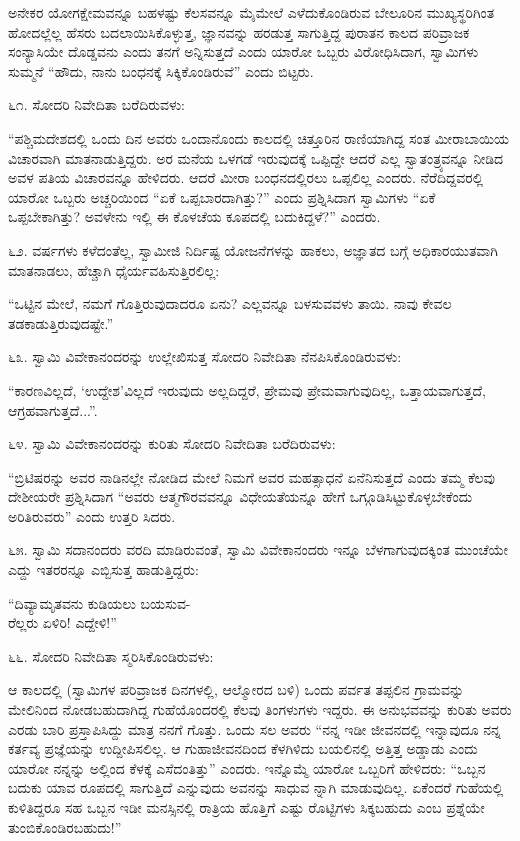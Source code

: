 ಅನೇಕರ ಯೋಗಕ್ಷೇಮವನ್ನೂ ಬಹಳಷ್ಟು ಕೆಲಸವನ್ನೂ ಮೈಮೇಲೆ ಎಳೆದುಕೊಂಡಿರುವ ಬೇಲೂರಿನ ಮುಖ್ಯಸ್ಥರಿಗಿಂತ ಹೋದಲ್ಲೆಲ್ಲ ಹೆಸರು ಬದಲಾಯಿಸಿಕೊಳ್ಳುತ್ತ, ಜ್ಞಾನವನ್ನು ಹರಡುತ್ತ ಸಾಗುತ್ತಿದ್ದ ಪುರಾತನ ಕಾಲದ ಪರಿವ್ರಾಜಕ ಸಂನ್ಯಾಸಿಯೇ ದೊಡ್ಡವನು ಎಂದು ತನಗೆ ಅನ್ನಿಸುತ್ತದೆ ಎಂದು ಯಾರೋ ಒಬ್ಬರು ವಿರೋಧಿಸಿದಾಗ, ಸ್ವಾಮಿಗಳು ಸುಮ್ಮನೆ “ಹೌದು, ನಾನು ಬಂಧನಕ್ಕೆ ಸಿಕ್ಕಿಕೊಂಡಿರುವೆ” ಎಂದು ಬಿಟ್ಟರು. 

೬೧. ಸೋದರಿ ನಿವೇದಿತಾ ಬರೆದಿರುವಳು:

“ಪಶ್ಚಿಮದೇಶದಲ್ಲಿ ಒಂದು ದಿನ ಅವರು ಒಂದಾನೊಂದು ಕಾಲದಲ್ಲಿ ಚಿತ್ತೂರಿನ ರಾಣಿಯಾಗಿದ್ದ ಸಂತ ಮೀರಾಬಾಯಿಯ ವಿಚಾರವಾಗಿ ಮಾತನಾಡುತ್ತಿದ್ದರು. ಅರ ಮನೆಯ ಒಳಗಡೆ ಇರುವುದಕ್ಕೆ ಒಪ್ಪಿದ್ದೇ ಆದರೆ ಎಲ್ಲ ಸ್ವಾತಂತ್ರ್ಯವನ್ನೂ ನೀಡಿದ ಅವಳ ಪತಿಯ ವಿಚಾರವನ್ನೂ ಹೇಳಿದರು. ಆದರೆ ಮೀರಾ ಬಂಧನದಲ್ಲಿರಲು ಒಪ್ಪಲಿಲ್ಲ ಎಂದರು. ನೆರೆದಿದ್ದವರಲ್ಲಿ ಯಾರೋ ಒಬ್ಬರು ಅಚ್ಚರಿಯಿಂದ “ಏಕೆ ಒಪ್ಪಬಾರದಾಗಿತ್ತು?” ಎಂದು ಪ್ರಶ್ನಿಸಿದಾಗ ಸ್ವಾಮಿಗಳು “ಏಕೆ ಒಪ್ಪಬೇಕಾಗಿತ್ತು? ಅವಳೇನು ಇಲ್ಲಿ ಈ ಕೊಳಚೆಯ ಕೂಪದಲ್ಲಿ ಬದುಕಿದ್ದಳೆ?” ಎಂದರು. 

೬೨. ವರ್ಷಗಳು ಕಳೆದಂತೆಲ್ಲ, ಸ್ವಾಮೀಜಿ ನಿರ್ದಿಷ್ಟ ಯೋಜನೆಗಳನ್ನು ಹಾಕಲು, ಅಜ್ಞಾತದ ಬಗ್ಗೆ ಅಧಿಕಾರಯುತವಾಗಿ ಮಾತನಾಡಲು, ಹೆಚ್ಚಾಗಿ ಧೈರ್ಯವಹಿಸುತ್ತಿರಲಿಲ್ಲ:

“ಒಟ್ಟಿನ ಮೇಲೆ, ನಮಗೆ ಗೊತ್ತಿರುವುದಾದರೂ ಏನು? ಎಲ್ಲವನ್ನೂ ಬಳಸುವವಳು ತಾಯಿ. ನಾವು ಕೇವಲ ತಡಕಾಡುತ್ತಿರುವುದಷ್ಟೇ.” 

೬೩. ಸ್ವಾಮಿ ವಿವೇಕಾನಂದರನ್ನು ಉಲ್ಲೇಖಿಸುತ್ತ ಸೋದರಿ ನಿವೇದಿತಾ ನೆನಪಿಸಿಕೊಂಡಿರುವಳು:

“ಕಾರಣವಿಲ್ಲದೆ, ‘ಉದ್ದೇಶ’ವಿಲ್ಲದೆ ಇರುವುದು ಅಲ್ಲದಿದ್ದರೆ, ಪ್ರೇಮವು ಪ್ರೇಮವಾಗುವುದಿಲ್ಲ, ಒತ್ತಾಯವಾಗುತ್ತದೆ, ಆಗ್ರಹವಾಗುತ್ತದೆ...”. 

೬೪. ಸ್ವಾಮಿ ವಿವೇಕಾನಂದರನ್ನು ಕುರಿತು ಸೋದರಿ ನಿವೇದಿತಾ ಬರೆದಿರುವಳು:

“ಬ್ರಿಟಿಷರನ್ನು ಅವರ ನಾಡಿನಲ್ಲೇ ನೋಡಿದ ಮೇಲೆ ನಿಮಗೆ ಅವರ ಮಹತ್ಸಾಧನೆ ಏನೆನಿಸುತ್ತದೆ ಎಂದು ತಮ್ಮ ಕೆಲವು ದೇಶೀಯರೇ ಪ್ರಶ್ನಿಸಿದಾಗ “ಅವರು ಆತ್ಮಗೌರವವನ್ನೂ ವಿಧೇಯತೆಯನ್ನೂ ಹೇಗೆ ಒಗ್ಗೂಡಿಸಿಟ್ಟುಕೊಳ್ಳಬೇಕೆಂದು ಅರಿತಿರುವರು” ಎಂದು ಉತ್ತರಿ ಸಿದರು. 

೬೫. ಸ್ವಾಮಿ ಸದಾನಂದರು ವರದಿ ಮಾಡಿರುವಂತೆ, ಸ್ವಾಮಿ ವಿವೇಕಾನಂದರು ಇನ್ನೂ ಬೆಳಗಾಗುವುದಕ್ಕಿಂತ ಮುಂಚೆಯೇ ಎದ್ದು ಇತರರನ್ನೂ ಎಬ್ಬಿಸುತ್ತ ಹಾಡುತ್ತಿದ್ದರು:

\begin{myquote}
“ದಿವ್ಯಾಮೃತವನು ಕುಡಿಯಲು ಬಯಸುವ-\\ರೆಲ್ಲರು ಏಳಿರಿ! ಎದ್ದೇಳಿ!” 
\end{myquote}

೬೬. ಸೋದರಿ ನಿವೇದಿತಾ ಸ್ಮರಿಸಿಕೊಂಡಿರುವಳು:

ಆ ಕಾಲದಲ್ಲಿ (ಸ್ವಾಮಿಗಳ ಪರಿವ್ರಾಜಕ ದಿನಗಳಲ್ಲಿ, ಆಲ್ಮೋರದ ಬಳಿ) ಒಂದು ಪರ್ವತ ತಪ್ಪಲಿನ ಗ್ರಾಮವನ್ನು ಮೇಲಿನಿಂದ ನೋಡಬಹುದಾಗಿದ್ದ ಗುಹೆಯೊಂದರಲ್ಲಿ ಕೆಲವು ತಿಂಗಳುಗಳು ಇದ್ದರು. ಈ ಅನುಭವವನ್ನು ಕುರಿತು ಅವರು ಎರಡು ಬಾರಿ ಪ್ರಸ್ತಾಪಿಸಿದ್ದು ಮಾತ್ರ ನನಗೆ ಗೊತ್ತು. ಒಂದು ಸಲ ಅವರು “ನನ್ನ ಇಡೀ ಜೀವನದಲ್ಲಿ ಇನ್ನಾವುದೂ ನನ್ನ ಕರ್ತವ್ಯ ಪ್ರಜ್ಞೆಯನ್ನು ಉದ್ದೀಪಿಸಲಿಲ್ಲ. ಆ ಗುಹಾಜೀವನದಿಂದ ಕೆಳಗಿಳಿದು ಬಯಲಿನಲ್ಲಿ ಅತ್ತಿತ್ತ ಅಡ್ಡಾಡು ಎಂದು ಯಾರೋ ನನ್ನನ್ನು ಅಲ್ಲಿಂದ ಕೆಳಕ್ಕೆ ಎಸೆದಂತಿತ್ತು” ಎಂದರು. ಇನ್ನೊಮ್ಮೆ ಯಾರೋ ಒಬ್ಬರಿಗೆ ಹೇಳಿದರು: “ಒಬ್ಬನ ಬದುಕು ಯಾವ ರೂಪದಲ್ಲಿ ಸಾಗುತ್ತಿದೆ ಎನ್ನುವುದು ಅವನನ್ನು ಸಾಧುವ ನ್ನಾಗಿ ಮಾಡುವುದಿಲ್ಲ. ಏಕೆಂದರೆ ಗುಹೆಯಲ್ಲಿ ಕುಳಿತಿದ್ದರೂ ಸಹ ಒಬ್ಬನ ಇಡೀ ಮನಸ್ಸಿನಲ್ಲಿ ರಾತ್ರಿಯ ಹೊತ್ತಿಗೆ ಎಷ್ಟು ರೊಟ್ಟಿಗಳು ಸಿಕ್ಕಬಹುದು ಎಂಬ ಪ್ರಶ್ನೆಯೇ ತುಂಬಿಕೊಂಡಿರಬಹುದು!” 

